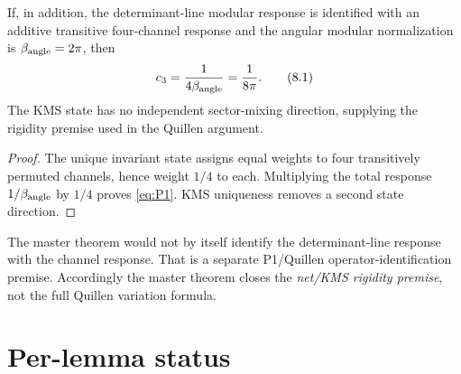 \begin{corollary}
If, in addition, the determinant-line modular response is identified
with an additive transitive four-channel response and the angular modular
normalization is $\beta_{\rm angle}=2\pi$, then
\[
 c_3=\frac1{4\beta_{\rm angle}}=\frac1{8\pi}.
\tag{8.1}\label{eq:P1}
\]
The KMS state has no independent sector-mixing direction, supplying the
rigidity premise used in the Quillen argument.
\end{corollary}

\begin{proof}
The unique invariant state assigns equal weights to four transitively
permuted channels, hence weight $1/4$ to each.  Multiplying the total
response $1/\beta_{\rm angle}$ by $1/4$ proves \eqref{eq:P1}.
KMS uniqueness removes a second state direction.
\end{proof}

\begin{remark}
The master theorem would not by itself identify the determinant-line
response with the channel response.  That is a separate
P1/Quillen operator-identification premise.  Accordingly the master
theorem closes the \emph{net/KMS rigidity premise}, not the full Quillen
variation formula.
\end{remark}

\section{Per-lemma status}


